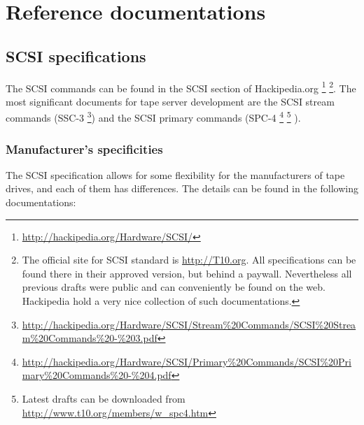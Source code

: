 
\section{Reference documentations}
\subsection{SCSI specifications}

The SCSI commands can be found in the SCSI section of Hackipedia.org
      \footnote{ \href{http://hackipedia.org/Hardware/SCSI/}{http://hackipedia.org/Hardware/SCSI/} }
      \footnote{The official site for SCSI standard is \href{http://T10.org}{http://T10.org}. All specifications
      can be found there in their approved version, but behind a paywall. Nevertheless all previous drafts were
      public and can conveniently be found on the web. Hackipedia hold a very nice collection of such
      documentations.}.
 The most significant documents for tape server development are the SCSI stream commands (SSC-3
      \footnote{ \href{http://hackipedia.org/Hardware/SCSI/Stream\%20Commands/SCSI\%20Stream\%20Commands\%20-\%203.pdf}
                      {http://hackipedia.org/Hardware/SCSI/Stream\%20Commands/SCSI\%20Stream\%20Commands\%20-\%203.pdf} })
 and the SCSI primary commands (SPC-4
      \footnote{ \href{http://hackipedia.org/Hardware/SCSI/Primary\%20Commands/SCSI\%20Primary\%20Commands\%20-\%204.pdf}
                      {http://hackipedia.org/Hardware/SCSI/Primary\%20Commands/SCSI\%20Primary\%20Commands\%20-\%204.pdf} }
      \footnote{ Latest drafts can be downloaded from \href{http://www.t10.org/members/w\_spc4.htm}
                                                           {http://www.t10.org/members/w\_spc4.htm} } ).

\subsubsection{Manufacturer's specificities}
\label{Manufacturer's specificities}
The SCSI specification allows for some flexibility for the manufacturers of tape drives, and 
each of them has differences. The details can be found in the following documentations:

